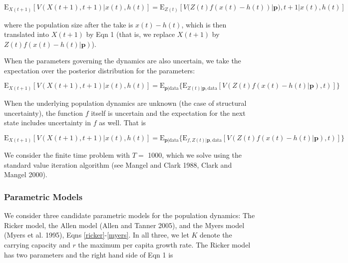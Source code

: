\documentclass[author-year, 12pt,review]{components/elsarticle} %
\begin{document}
\begin{equation}
\mathbf{\mathrm{E}}_{X(t+1)} \left[ V( X(t+1),t+1) | x(t), h(t) \right] = \mathbf{\mathrm{E}}_{Z(t)} \left[V( Z(t) f(x(t) - h(t))|\mathbf{p}), t+1 | x(t), h(t) \right]
\end{equation}

where the population size after the take is $x(t) - h(t)$, which is then
translated into $X(t+1)$ by Eqn 1 (that is, we replace $X(t+1)$ by
$Z(t) f(x(t)-h(t)|\mathbf{p})$).

When the parameters governing the dynamics are also uncertain, we take
the expectation over the posterior distribution for the parameters:

\begin{equation}
\mathbf{\mathrm{E}}_{X(t+1)} \left[ V(X(t+1), t+1) | x(t), h(t) \right] = \mathbf{\mathrm{E}}_{\mathbf{p}|\mathrm{data}} \{ \mathbf{\mathrm{E}}_{Z(t) | \mathbf{p}, \mathrm{data}} \left[ V(Z(t) f(x(t) - h(t)|\mathbf{p}), t)  \right] \}
\end{equation}

When the underlying population dynamics are unknown (the case of
structural uncertainty), the function $f$ itself is uncertain and the
expectation for the next state includes uncertainty in $f$ as well. That
is

\begin{equation}
\mathbf{\mathrm{E}}_{X(t+1)} \left[ V(X(t+1), t+1) | x(t), h(t) \right] = \mathbf{\mathrm{E}}_{\mathbf{p}|\mathrm{data}} \{ \mathbf{\mathrm{E}}_{f, Z(t) | \mathbf{p}, \mathrm{data}} \left[ V( Z(t) f(x(t) - h(t)| \mathbf{p}), t) \right] \}
\end{equation}

We consider the finite time problem with $T=$ 1000, which we solve using
the standard value iteration algorithm (see Mangel and Clark 1988, Clark
and Mangel 2000).

\subsubsection{Parametric Models}\label{parametric-models}

We consider three candidate parametric models for the population
dynamics: The Ricker model, the Allen model (Allen and Tanner 2005), and
the Myers model (Myers et al. 1995), Eqns \eqref{ricker}-\eqref{myers}.
In all three, we let $K$ denote the carrying capacity and $r$ the
maximum per capita growth rate. The Ricker model has two parameters and
the right hand side of Eqn 1 is
\end{document}

